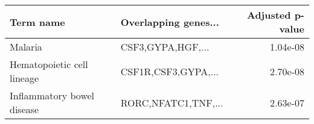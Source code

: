 \begin{tabular}{llr}
\toprule
                 Term name & Overlapping genes... &  Adjusted p-value \\
\midrule
                   Malaria &    CSF3,GYPA,HGF,... &          1.04e-08 \\
Hematopoietic cell lineage &  CSF1R,CSF3,GYPA,... &          2.70e-08 \\
Inflammatory bowel disease &  RORC,NFATC1,TNF,... &          2.63e-07 \\
\bottomrule
\end{tabular}
